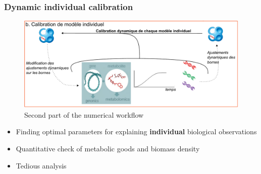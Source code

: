 \documentclass[8pt]{beamer}
\begin{document}
\begin{frame}
\frametitle{Dynamic individual calibration}
\begin{figure}
\includegraphics[width=\textwidth]{figures/calibration.pdf}
\caption{Second part of the numerical workflow}
\end{figure}

\begin{block}{}
\begin{itemize}
\item Finding optimal parameters for explaining \textbf{individual} biological observations
\item Quantitative check of metabolic goods and biomass density
\item Tedious analysis
\end{itemize}
\end{block}

\end{frame}
\end{document}
